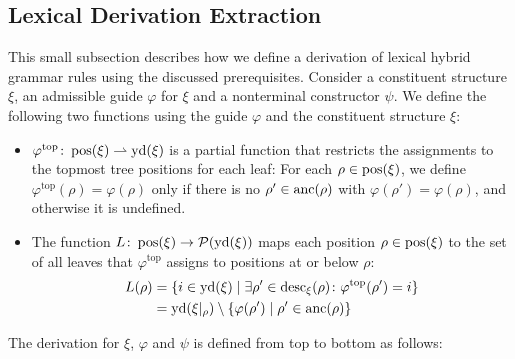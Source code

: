 \documentclass[../../document.tex]{subfiles}
\begin{document}
    \subsection{Lexical Derivation Extraction}\label{sec:extractionalg}
    This small subsection describes how we define a derivation of lexical hybrid grammar rules using the discussed prerequisites.
    Consider a constituent structure \(\xi\), an admissible guide \(\varphi\) for \(\xi\) and a nonterminal constructor \(\psi\).
    We define the following two functions using the guide \(\varphi\) and the constituent structure \(\xi\):
    \begin{itemize}
        \item
            \(\varphi^{\text{top}}\colon \operatorname{pos}(\xi) \rightharpoonup \operatorname{yd}(\xi)\) is a partial function that restricts the assignments to the topmost tree positions for each leaf:
            For each \(\rho \in \operatorname{pos}(\xi)\), we define \(\varphi^{\text{top}}(\rho) = \varphi(\rho)\) only if there is no \(\rho' \in \operatorname{anc}(\rho)\) with \(\varphi(\rho') = \varphi(\rho)\), and otherwise it is undefined.
        \item
            The function \(L\colon \operatorname{pos}(\xi) \to \mathcal{P}(\operatorname{yd}(\xi))\) maps each position \(\rho\in \operatorname{pos}(\xi)\) to the set of all leaves that \(\varphi^{\text{top}}\) assigns to positions at or below \(\rho\):
                \begin{align*}
                    L(\rho) &= \{ i \in \operatorname{yd}(\xi) \mid \exists \rho' \in \operatorname{desc}_\xi(\rho)\colon \varphi^{\text{top}}(\rho') = i \} \\
                            &= \operatorname{yd}(\xi|_\rho) \setminus \{ \varphi(\rho') \mid \rho' \in \operatorname{anc}(\rho) \}
                \end{align*}
    \end{itemize}
    The derivation for \(\xi\), \(\varphi\) and \(\psi\) is defined from top to bottom as follows:
\end{document}
